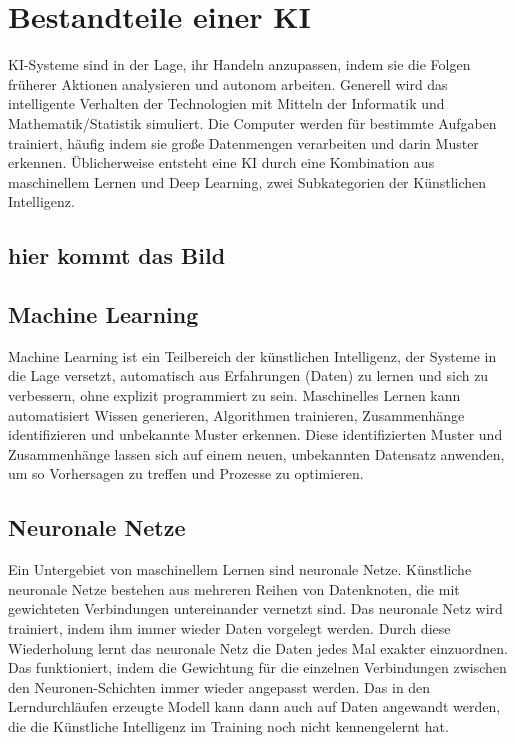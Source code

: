\documentclass{report}
\begin{document}
   \chapter{Bestandteile einer KI}
 
KI-Systeme sind in der Lage, ihr Handeln anzupassen, indem sie die Folgen früherer Aktionen analysieren und autonom arbeiten.
 Generell wird das intelligente Verhalten der 
Technologien mit Mitteln der Informatik und Mathematik/Statistik simuliert.
 Die Computer werden für bestimmte Aufgaben trainiert, häufig indem sie große Datenmengen 
 verarbeiten und darin Muster erkennen. Üblicherweise entsteht eine KI durch eine Kombination aus maschinellem
  Lernen und Deep Learning, zwei Subkategorien der Künstlichen Intelligenz.

\section {hier kommt das Bild}

 \section{Machine Learning}
 Machine Learning ist ein Teilbereich der künstlichen Intelligenz, der Systeme in die Lage versetzt, automatisch 
 aus Erfahrungen (Daten) zu lernen und sich zu verbessern, ohne explizit programmiert zu sein.
 Maschinelles Lernen kann automatisiert Wissen generieren, Algorithmen trainieren, Zusammenhänge identifizieren und unbekannte Muster erkennen. 
 Diese identifizierten Muster und Zusammenhänge lassen sich auf einem neuen, unbekannten Datensatz anwenden, 
 um so Vorhersagen zu treffen und Prozesse zu optimieren.

\section{Neuronale Netze}
 Ein Untergebiet von maschinellem Lernen sind neuronale Netze. Künstliche neuronale Netze bestehen aus mehreren Reihen von Datenknoten, 
 die mit gewichteten Verbindungen untereinander vernetzt sind.
Das neuronale Netz wird trainiert, indem ihm immer wieder Daten vorgelegt werden. Durch diese Wiederholung lernt
das neuronale Netz die Daten jedes Mal exakter einzuordnen. Das funktioniert, indem die Gewichtung für die einzelnen Verbindungen
 zwischen den Neuronen-Schichten immer wieder angepasst werden. Das in den Lerndurchläufen 
erzeugte Modell kann dann auch auf Daten angewandt werden, die die Künstliche Intelligenz im Training noch nicht kennengelernt hat.
\end{document}
